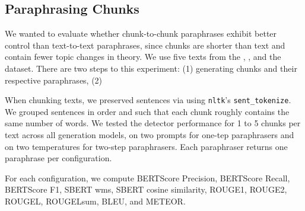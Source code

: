 \subsection{Paraphrasing Chunks}
\label{subsec:paraphrasing_chunks}

We wanted to evaluate whether chunk-to-chunk paraphrases exhibit better control than text-to-text paraphrases, since chunks are shorter than text and contain fewer topic changes in theory.
We use five texts from the \dataBlog{}, \dataGutenberg{}, and the \dataStudent{} dataset.
There are two steps to this experiment: (1) generating chunks and their respective paraphrases, (2) 

When chunking texts, we preserved sentences via using \texttt{nltk}'s \texttt{sent\_tokenize}.
We grouped sentences in order and such that each chunk roughly contains the same number of words.
We tested the detector performance for 1 to 5 chunks per text across all \imp{} generation models, on two prompts for one-tep paraphrasers and on two temperatures for two-step paraphrasers.
Each paraphraser returns one paraphrase per configuration.

For each configuration, we compute BERTScore Precision, BERTScore Recall, BERTScore F1, SBERT \ac{wms}, SBERT cosine similarity, ROUGE1, ROUGE2, ROUGEL, ROUGELsum, BLEU, and METEOR.
